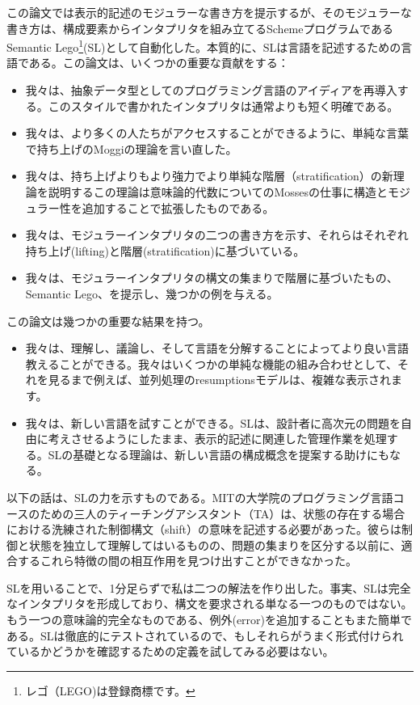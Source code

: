 \documentclass[11pt, oneside]{jsbook}   	%
\begin{document}
この論文では表示的記述のモジュラーな書き方を提示するが、そのモジュラーな書き方は、構成要素からインタプリタを組み立てるSchemeプログラムであるSemantic Lego\footnote{レゴ（LEGO)は登録商標です。}(SL)として自動化した。本質的に、SLは言語を記述するための言語である。この論文は、いくつかの重要な貢献をする：
\begin{itemize}
\item 我々は、抽象データ型としてのプログラミング言語のアイディアを再導入する。このスタイルで書かれたインタプリタは通常よりも短く明確である。

\item 我々は、より多くの人たちがアクセスすることができるように、単純な言葉で持ち上げのMoggiの理論を言い直した。

\item 我々は、持ち上げよりもより強力でより単純な階層（stratification）の新理論を説明するこの理論は意味論的代数についてのMossesの仕事に構造とモジュラー性を追加することで拡張したものである。

\item 我々は、モジュラーインタプリタの二つの書き方を示す、それらはそれぞれ持ち上げ(lifting)と階層(stratification)に基づいている。

\item 我々は、モジュラーインタプリタの構文の集まりで階層に基づいたもの、Semantic Lego、を提示し、幾つかの例を与える。
\end{itemize}
この論文は幾つかの重要な結果を持つ。
\begin{itemize}
\item 我々は、理解し、議論し、そして言語を分解することによってより良い言語教えることができる。我々はいくつかの単純な機能の組み合わせとして、それを見るまで例えば、並列処理のresumptionsモデルは、複雑な表示されます。

\item 我々は、新しい言語を試すことができる。SLは、設計者に高次元の問題を自由に考えさせるようにしたまま、表示的記述に関連した管理作業を処理する。SLの基礎となる理論は、新しい言語の構成概念を提案する助けにもなる。
\end{itemize}
以下の話は、SLの力を示すものである。MITの大学院のプログラミング言語コースのための三人のティーチングアシスタント（TA）は、状態の存在する場合における洗練された制御構文（shift）の意味を記述する必要があった。彼らは制御と状態を独立して理解してはいるものの、問題の集まりを区分する以前に、適合するこれら特徴の間の相互作用を見つけ出すことができなかった。

SLを用いることで、1分足らずで私は二つの解法を作り出した。事実、SLは完全なインタプリタを形成しており、構文を要求される単なる一つのものではない。もう一つの意味論的完全なものである、例外(error)を追加することもまた簡単である。SLは徹底的にテストされているので、もしそれらがうまく形式付けられているかどうかを確認するための定義を試してみる必要はない。
\end{document}

